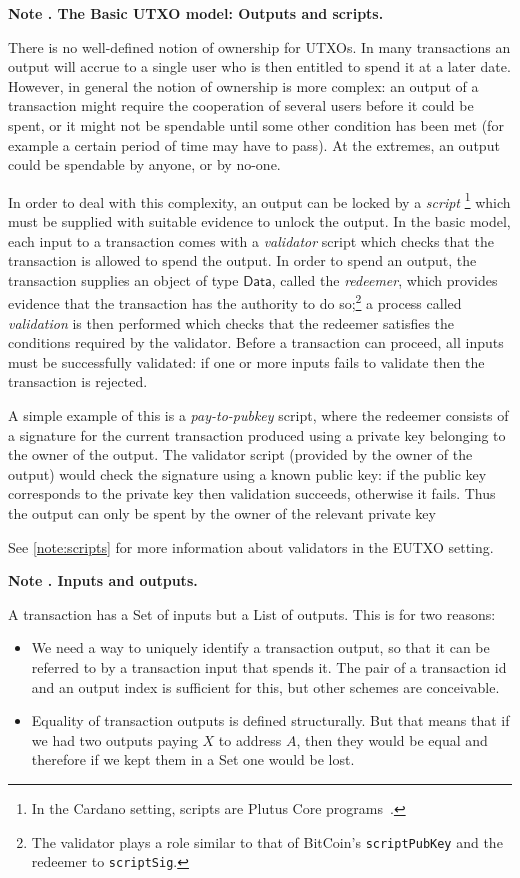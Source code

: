 \documentclass[a4paper]{article}
\newcounter{note}
\newcommand{\note}[1]{
  \bigskip
  \refstepcounter{note}
  \noindent\textbf{Note \thenote. #1}
}
\renewcommand{\i}{\textit}  %
\newcommand{\s}{\textsf}  %
\newcommand{\Data}{\ensuremath{\s{Data}}}
\begin{document}
\note{The Basic UTXO model: Outputs and scripts.}
\label{note:basic-utxo}
There is no well-defined notion of ownership for UTXOs.  In many
transactions an output will accrue to a single user who is then
entitled to spend it at a later date.  However, in general the notion
of ownership is more complex: an output of a transaction might require
the cooperation of several users before it could be spent, or it might
not be spendable until some other condition has been met (for example
a certain period of time may have to pass).  At the extremes, an
output could be spendable by anyone, or by no-one.

In order to deal with this complexity, an output can be locked by a
\textit{script}%
\footnote{In the Cardano setting, scripts are Plutus Core
  programs~\citep{Plutus-Core-spec}.}
which must be supplied with suitable evidence to unlock the output.
In the basic model, each input to a transaction comes with a
\i{validator} script which checks that the transaction is allowed to
spend the output.  In order to spend an output, the transaction
supplies an object of type $\Data$, called the \i{redeemer}, which provides
evidence that the transaction has the authority to do so;\footnote{The
  validator plays a role similar to that of BitCoin's
  \texttt{scriptPubKey} and the redeemer to \texttt{scriptSig}.
} a process called \i{validation} is then performed which checks that
the redeemer satisfies the conditions required by the validator.
Before a transaction can proceed, all inputs must be successfully
validated: if one or more inputs fails to validate then the
transaction is rejected.

A simple example of this is a \i{pay-to-pubkey} script, where the
redeemer consists of a signature for the current transaction produced
using a private key belonging to the owner of the output.  The
validator script (provided by the owner of the output) would check the
signature using a known public key: if the public key corresponds to
the private key then validation succeeds, otherwise it fails.  Thus
the output can only be spent by the owner of the relevant private key

See \cref{note:scripts} for more information about validators in
the EUTXO setting.

\note{Inputs and outputs.}
\label{note:inputs-and-outputs}
A transaction has a \textsf{Set} of inputs but a \textsf{List} of outputs.
This is for two reasons:
\begin{itemize}
  \item We need a way to uniquely identify a transaction output, so
  that it can be referred to by a transaction input that spends it. The pair of
  a transaction id and an output index is sufficient for this, but other schemes
  are conceivable.
  \item Equality of transaction outputs is defined structurally. But that means
    that if we had two outputs paying $X$ to address $A$, then they would be
    equal and therefore if we kept them in a \s{Set} one would be lost.
\end{itemize}
\end{document}
